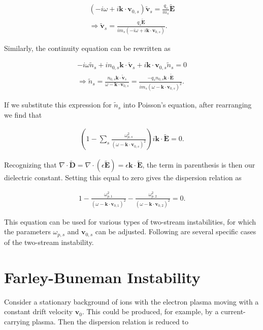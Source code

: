 \documentclass[12pt]{article}
\newcommand{\mb}{\mathbf}
\begin{document}
\begin{align*}
(-i\omega + i \mb{k} \cdot \mb{v}_{0,s})\tilde{\mb{v}}_s = \frac{q_s}{m_s} \tilde{\mb{E}} \\
\Rightarrow \tilde{\mb{v}}_s = \frac{q_s \tilde{\mb{E}}}{i m_s (-i\omega + i \mb{k} \cdot \mb{v}_{0,s})}.
\end{align*}

Similarly, the continuity equation can be rewritten as

\begin{align*}
-i\omega \tilde{n}_s + i n_{0,s} \mb{k} \cdot \tilde{\mb{v}}_s + i \mb{k} \cdot \mb{v}_{0,s} \tilde{n}_s = 0 \\
\Rightarrow \tilde{n}_s = \frac{n_{0,s} \mb{k} \cdot \tilde{\mb{v}}_s}{\omega - \mb{k} \cdot \mb{v}_{0,s}} = \frac{-q_s n_{0,s} \mb{k} \cdot \tilde{\mb{E}}}{i m_s (\omega - \mb{k} \cdot \mb{v}_{0,s})^2}.
\end{align*}

If we substitute this expression for $\tilde{n}_s$ into Poisson's equation, after rearranging we find that

\begin{align*}
\left(1 - \sum_s\frac{\omega_{p,s}^2}{(\omega - \mb{k} \cdot \mb{v}_{0,s})^2}\right)i \mb{k} \cdot \tilde{\mb{E}} = 0.
\end{align*}

Recognizing that $\nabla \cdot \tilde{\mb{D}} = \nabla \cdot (\epsilon \tilde{\mb{E}}) = \epsilon \mb{k} \cdot \tilde{\mb{E}}$, the term in parenthesis is then our dielectric constant. Setting this equal to zero gives the dispersion relation as

\begin{align*}
1 - \frac{\omega_{p,1}^2}{(\omega - \mb{k} \cdot \mb{v}_{0,1})^2} - \frac{\omega_{p,2}^2}{(\omega - \mb{k} \cdot \mb{v}_{0,2})^2} = 0.
\end{align*}

This equation can be used for various types of two-stream instabilities, for which the parameters $\omega_{p,s}$ and $\mb{v}_{0,s}$ can be adjusted. Following are several specific cases of the two-stream instability.

\section*{Farley-Buneman Instability}
Consider a stationary background of ions with the electron plasma moving with a constant drift velocity $\mb{v}_0$. This could be produced, for example, by a current-carrying plasma. Then the dispersion relation is reduced to
\end{document}
